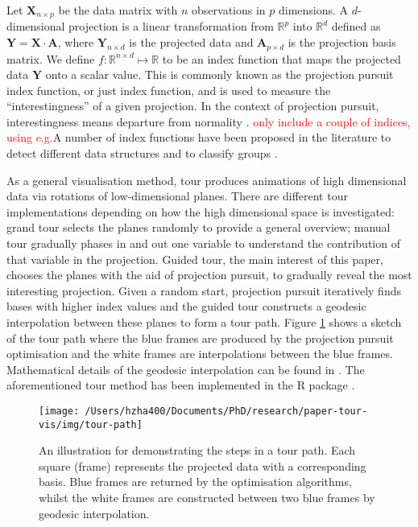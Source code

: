 Let \(\mathbf{X}_{n \times p}\) be the data matrix with \(n\)
observations in \(p\) dimensions. A \(d\)-dimensional projection is a
linear transformation from \(\mathbb{R}^p\) into \(\mathbb{R}^d\)
defined as \(\mathbf{Y} = \mathbf{X} \cdot \mathbf{A}\), where
\(\mathbf{Y}_{n \times d}\) is the projected data and
\(\mathbf{A}_{p\times d}\) is the projection basis matrix. We define
\(f: \mathbb{R}^{n \times d} \mapsto \mathbb{R}\) to be an index
function that maps the projected data \(\mathbf{Y}\) onto a scalar
value. This is commonly known as the projection pursuit index function,
or just index function, and is used to measure the ``interestingness''
of a given projection. In the context of projection pursuit,
interestingness means departure from normality
\citep{diaconis1984asymptotics, huber1985projection}.
\textcolor{red}{only include a couple of indices, using e.g.}A number of
index functions have been proposed in the literature to detect different
data structures
\citep{friedman1974projection, hall1989polynomial, cook1993projection, posse1995projection}
and to classify groups \citep{lee2005projection, lee2010projection}.

As a general visualisation method, tour produces animations of high
dimensional data via rotations of low-dimensional planes. There are
different tour implementations depending on how the high dimensional
space is investigated: grand tour \citep{cook2008grand} selects the
planes randomly to provide a general overview; manual tour
\citep{cook1997manual} gradually phases in and out one variable to
understand the contribution of that variable in the projection. Guided
tour, the main interest of this paper, chooses the planes with the aid
of projection pursuit, to gradually reveal the most interesting
projection. Given a random start, projection pursuit iteratively finds
bases with higher index values and the guided tour constructs a geodesic
interpolation between these planes to form a tour path. Figure
\ref{fig:tour-path} shows a sketch of the tour path where the blue
frames are produced by the projection pursuit optimisation and the white
frames are interpolations between the blue frames. Mathematical details
of the geodesic interpolation can be found in
\citet{buja2005computational}. The aforementioned tour method has been
implemented in the R package  \citep{tourr}.

\begin{Schunk}
\begin{figure}

{\centering \texttt{[image: /Users/hzha400/Documents/PhD/research/paper-tour-vis/img/tour-path]} 

}

\caption[An illustration for demonstrating the steps in a tour path]{An illustration for demonstrating the steps in a tour path. Each square (frame) represents the projected data with a corresponding basis. Blue frames are returned by the optimisation algorithms, whilst the white frames are constructed between two blue frames by geodesic interpolation.}\label{fig:tour-path}
\end{figure}
\end{Schunk}

